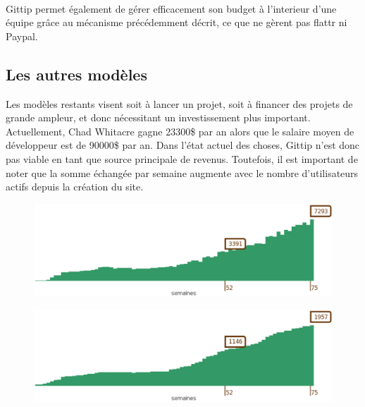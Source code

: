 \paragraph{} Gittip permet également de gérer efficacement son budget à
l'interieur d'une équipe grâce au mécanisme précédemment décrit, ce que ne
gèrent pas flattr ni Paypal.

\subsection{Les autres modèles}

Les modèles restants visent soit à lancer un projet, soit à financer des
projets de grande ampleur, et donc nécessitant un investissement plus
important.  Actuellement, Chad Whitacre gagne 23300\$ par an alors que le
salaire moyen de développeur est de 90000\$ par an. Dans l'état actuel des
choses, Gittip n'est donc pas viable en tant que source principale de revenus.
Toutefois, il est important de noter que la somme échangée par semaine augmente
avec le nombre d'utilisateurs actifs depuis la création du site.

\begin{figure}[h!]  \centering
\includegraphics[width=16cm]{images/gittip_amount.eps} \end{figure}
\begin{figure}[h!] 
\centering \includegraphics[width=16cm]{images/gittip_user.eps} \end{figure}


